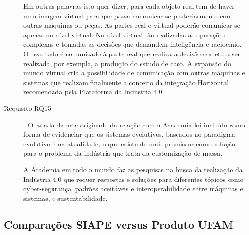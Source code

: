 \begin{description}
Em outras palavras isto quer dizer, para cada objeto real tem de haver uma imagem virtual para que possa comunicar-se posteriormente com outras máquinas ou peças. As partes real e virtual poderão comunicar-se apenas no nível virtual. No nível virtual são realizadas as operações complexas e tomadas as decisões que demandem inteligência e raciocínio. O resultado é comunicado à parte real que realiza a decisão correta a ser realizada, por exemplo, a produção do estudo de caso. A expansão do mundo virtual cria a possibilidade de comunicação com outras máquinas e sistemas que realizam finalmente o conceito da integração Horizontal recomendada pela Plataforma da Indústria 4.0.
	
	\item[Requisito RQ15] - O estado da arte originado da relação com a Academia foi incluído como forma de evidenciar que os sistemas evolutivos, baseados no paradigma evolutivo é na atualidade, o que existe de mais promissor como solução para o problema da indústria que trata da customização de massa.
	
A Academia em todo o mundo faz as pesquisas na busca da realização da Indústria 4.0 que requer respostas e soluções para diferentes tópicos como cyber-segurança, padrões aceitáveis e interoperabilidade entre máquinas e sistemas, e sustentabilidade. 
		
\end{description}	


\newpage


\subsection{Comparações SIAPE versus Produto UFAM}


